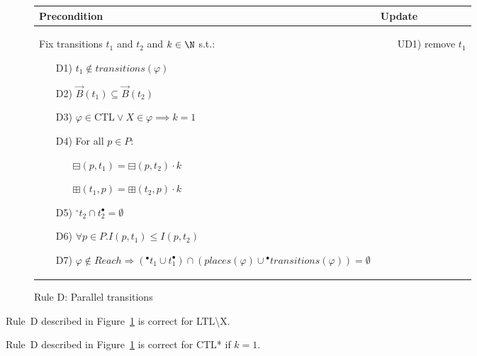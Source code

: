 \begin{figure}[h!]
\begin{tikzpicture}
    \end{tikzpicture}
    \vspace{5mm}
    \begin{adjustbox}{center}
        \begin{tabular}{|p{75mm}|p{45mm}|} \hline
        Precondition & Update \\ \hline
        Fix transitions $t_1$ and $t_2$ and $k\in\N$ s.t.:
        \begin{itemize}[leftmargin=10mm]
            \item[D1)] $t_1\notin transitions(\varphi)$
            \item[D2)] $\vec B(t_1)\subseteq\vec B(t_2)$
            \item[D3)] $\varphi\in\text{CTL}\lor X\in\varphi\implies k=1$
            \item[D4)] For all $p\in P$:
            \begin{itemize}
                \item[] $\boxminus(p, t_1) = \boxminus(p, t_2) \cdot k $
                \item[] $\boxplus(t_1, p) = \boxplus(t_2, p) \cdot k $
            \end{itemize}
            \item[D5)] ${}^\circ t_2\cap t_2^\bullet=\emptyset$
            \item[D6)] $\forall p \in P.I(p, t_1) \leq I(p, t_2)$
            \item[D7)] $\varphi\notin Reach\Rightarrow ({}^\bullet t_1\cup t_1^\bullet) \cap (places(\varphi)\cup{}^\bullet transitions(\varphi))=\emptyset$
        \end{itemize}
        &
        \begin{itemize}[leftmargin=12mm]
            \item[UD1)] remove $t_1$
        \end{itemize} \\ \hline
        \end{tabular}
    \end{adjustbox}
    \caption{Rule D: Parallel transitions}
    \label{fig:rule_d_cpn}
\end{figure}

\begin{theorem}
    Rule~D described in Figure~\ref{fig:rule_d_cpn} is correct for LTL\textbackslash X.
\end{theorem}

\begin{theorem}
    Rule~D described in Figure~\ref{fig:rule_d_cpn} is correct for CTL* if $k=1$.
\end{theorem}